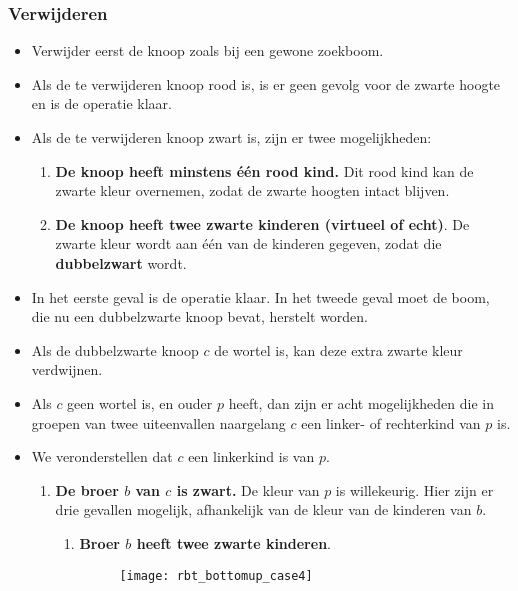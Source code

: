 \subsubsection{Verwijderen}
\begin{itemize}
    \item Verwijder eerst de knoop zoals bij een gewone zoekboom.
    \item Als de te verwijderen knoop rood is, is er geen gevolg voor de zwarte hoogte en is de operatie klaar.
    \item Als de te verwijderen knoop zwart is, zijn er twee mogelijkheden:
    \begin{enumerate}
        \item \textbf{De knoop heeft minstens één rood kind.} Dit rood kind kan de zwarte kleur overnemen, zodat de zwarte hoogten intact blijven.
        \item \textbf{De knoop heeft twee zwarte kinderen (virtueel of echt)}. De zwarte kleur wordt aan één van de kinderen gegeven, zodat die \textbf{dubbelzwart} wordt.
    \end{enumerate}
    \item In het eerste geval is de operatie klaar. In het tweede geval moet de boom, die nu een dubbelzwarte knoop bevat, herstelt worden.
    \item Als de dubbelzwarte knoop $c$ de wortel is, kan deze extra zwarte kleur verdwijnen. 
    \item Als $c$ geen wortel is, en ouder $p$ heeft, dan zijn er acht mogelijkheden die in groepen van twee uiteenvallen naargelang $c$ een linker- of rechterkind van $p$ is.
    \item We veronderstellen dat $c$ een linkerkind is van $p$.
    \begin{enumerate}
        \item \textbf{De broer $b$ van $c$ is zwart.} De kleur van $p$ is willekeurig. Hier zijn er drie gevallen mogelijk, afhankelijk van de kleur van de kinderen van $b$.
        \begin{enumerate}
            \item \textbf{Broer $b$ heeft twee zwarte kinderen}.
            \begin{figure}[ht]
                \centering
                \texttt{[image: rbt\_bottomup\_case4]}
                \caption{}
                \label{fig:rbt_bottomup_case4}
            \end{figure}
            \begin{itemize}

\end{itemize}
\end{enumerate}
\end{enumerate}
\end{itemize}
